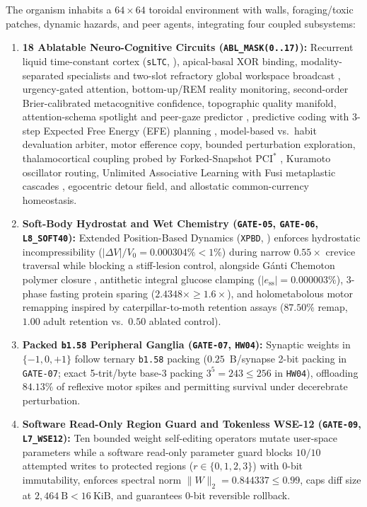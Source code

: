 \documentclass[11pt,reqno]{amsart}
\theoremstyle{remark}
\begin{document}
The organism inhabits a $64 \times 64$ toroidal environment with walls, foraging/toxic patches, dynamic hazards, and peer agents, integrating four coupled subsystems:
\begin{enumerate}[leftmargin=1.8em, itemsep=2pt]
  \item \textbf{18 Ablatable Neuro-Cognitive Circuits (\texttt{ABL\_MASK(0..17)}):} Recurrent liquid time-constant cortex (\texttt{sLTC}, \cite{hasani2021}), apical-basal XOR binding, modality-separated specialists and two-slot refractory global workspace broadcast \cite{baars2005,blum2022}, urgency-gated attention, bottom-up/REM reality monitoring, second-order Brier-calibrated metacognitive confidence, topographic quality manifold, attention-schema spotlight and peer-gaze predictor \cite{graziano2015}, predictive coding with 3-step Expected Free Energy (EFE) planning \cite{friston2010}, model-based vs.\ habit devaluation arbiter, motor efference copy, bounded perturbation exploration, thalamocortical coupling probed by Forked-Snapshot $\text{PCI}^*$ \cite{casali2013,tononi2016}, Kuramoto oscillator routing, Unlimited Associative Learning with Fusi metaplastic cascades \cite{ginsburg2019,fusi2005}, egocentric detour field, and allostatic common-currency homeostasis.
  \item \textbf{Soft-Body Hydrostat and Wet Chemistry (\texttt{GATE-05}, \texttt{GATE-06}, \texttt{L8\_SOFT40}):} Extended Position-Based Dynamics (\texttt{XPBD}, \cite{macklin2016}) enforces hydrostatic incompressibility ($|\Delta V|/V_0 = 0.000304\% < 1\%$) during narrow $0.55\times$ crevice traversal while blocking a stiff-lesion control, alongside G\'{a}nti Chemoton polymer closure \cite{ganti2003}, antithetic integral glucose clamping \cite{briat2016} ($|e_{\text{ss}}| = 0.000003\%$), 3-phase fasting protein sparing ($2.4348\times \ge 1.6\times$), and holometabolous motor remapping inspired by caterpillar-to-moth retention assays \cite{blackiston2008,blackiston2021} ($87.50\%$ remap, $1.00$ adult retention vs.\ $0.50$ ablated control).
  \item \textbf{Packed \texttt{b1.58} Peripheral Ganglia (\texttt{GATE-07}, \texttt{HW04}):} Synaptic weights in $\{-1, 0, +1\}$ follow ternary \texttt{b1.58} packing \cite{ma2024} ($0.25$~B/synapse 2-bit packing in \texttt{GATE-07}; exact 5-trit/byte base-3 packing $3^5 = 243 \le 256$ in \texttt{HW04}), offloading $84.13\%$ of reflexive motor spikes and permitting survival under decerebrate perturbation.
  \item \textbf{Software Read-Only Region Guard and Tokenless WSE-12 (\texttt{GATE-09}, \texttt{L7\_WSE12}):} Ten bounded weight self-editing operators mutate user-space parameters while a software read-only parameter guard blocks $10/10$ attempted writes to protected regions ($r \in \{0,1,2,3\}$) with 0-bit immutability, enforces spectral norm $\|W\|_2 = 0.844337 \le 0.99$, caps diff size at $2{,}464~\text{B} < 16~\text{KiB}$, and guarantees 0-bit reversible rollback.
\end{enumerate}
\end{document}
